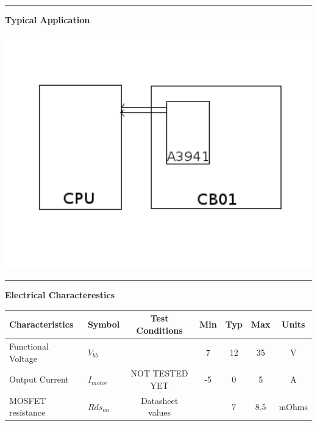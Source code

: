 \documentclass{article}
\begin{document}
\\
\hspace{0.3in}
\hrule
\hspace{0.3in}
\begin{center} 
\large{\textbf{Typical Application}}
\end{center}
\begin{center}
\includegraphics[width=6in]{cb01_typical.png}
\end{center}
\hrule
\newpage
\large{\textbf{Electrical Characterestics}} \\
\begin{center}
\begin{tabular}{|l | l |c| c|c|c|c|}
\hline
Characteristics & Symbol &Test Conditions & Min & Typ & Max & Units \\ \hline
Functional Voltage& $V_{bb}$& & 7&12&35&V \\ \hline 
Output Current & $I_{motor}$ & NOT TESTED YET& -5 & 0& 5 &A \\ \hline
MOSFET resistance & $Rds_{on}$  & Datasheet values& & 7 & 8.5 & mOhms\\\hline
\hline
\end{tabular}
\end{center}
\end{document}
